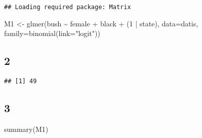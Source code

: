 \documentclass[
]{article}
\newenvironment{Shaded}{\begin{snugshade}}{\end{snugshade}}
\newcommand{\AttributeTok}[1]{\textcolor[rgb]{0.77,0.63,0.00}{#1}}
\newcommand{\DecValTok}[1]{\textcolor[rgb]{0.00,0.00,0.81}{#1}}
\newcommand{\FunctionTok}[1]{\textcolor[rgb]{0.00,0.00,0.00}{#1}}
\newcommand{\NormalTok}[1]{#1}
\newcommand{\OtherTok}[1]{\textcolor[rgb]{0.56,0.35,0.01}{#1}}
\newcommand{\SpecialCharTok}[1]{\textcolor[rgb]{0.00,0.00,0.00}{#1}}
\newcommand{\StringTok}[1]{\textcolor[rgb]{0.31,0.60,0.02}{#1}}
\begin{document}
\begin{verbatim}
## Loading required package: Matrix
\end{verbatim}

\begin{Shaded}
\begin{Highlighting}[]
\NormalTok{M1 }\OtherTok{\textless{}{-}} \FunctionTok{glmer}\NormalTok{(bush }\SpecialCharTok{\textasciitilde{}}\NormalTok{ female }\SpecialCharTok{+}\NormalTok{ black }\SpecialCharTok{+}\NormalTok{ (}\DecValTok{1} \SpecialCharTok{|}\NormalTok{ state), }
                        \AttributeTok{data=}\NormalTok{datis, }\AttributeTok{family=}\FunctionTok{binomial}\NormalTok{(}\AttributeTok{link=}\StringTok{"logit"}\NormalTok{))}
\end{Highlighting}
\end{Shaded}

\hypertarget{section-1}{%
\subsection{2}\label{section-1}}

\begin{Shaded}
\end{Shaded}

\begin{verbatim}
## [1] 49
\end{verbatim}

\hypertarget{section-2}{%
\subsection{3}\label{section-2}}

\begin{Shaded}
\begin{Highlighting}[]
\FunctionTok{summary}\NormalTok{(M1)}
\end{Highlighting}
\end{Shaded}
\end{document}
